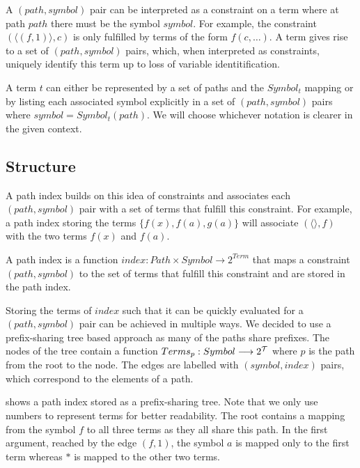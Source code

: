 A $(path, symbol)$ pair can be interpreted as a constraint on a term where at path $path$ there must be the symbol $symbol$. For example, the constraint $(\langle (f,1) \rangle, c)$ is only fulfilled by terms of the form $f(c,\dots)$. A term gives rise to a set of $(path, symbol)$ pairs, which, when interpreted as constraints, uniquely identify this term up to loss of variable identitification.

A term $t$ can either be represented by a set of paths and the $Symbol_{t}$ mapping or by listing each associated symbol explicitly in a set of $(path, symbol)$ pairs where $symbol = Symbol_{t}(path)$. We will choose whichever notation is clearer in the given context.

\subsection{Structure}
A path index builds on this idea of constraints and associates each $(path, symbol)$ pair with a set of terms that fulfill this constraint. For example, a path index storing the terms $\{f(x), f(a), g(a)\}$ will associate $(\langle \rangle, f)$ with the two terms $f(x)$ and $f(a)$.

\begin{defn}
  A path index is a function $index: Path \times Symbol \longrightarrow 2^{Term}$ that maps a constraint $(path,symbol)$ to the set of terms that fulfill this constraint and are stored in the path index.
\end{defn}

Storing the terms of $index$ such that it can be quickly evaluated for a $(path, symbol)$ pair can be achieved in multiple ways. We decided to use a prefix-sharing tree based approach as many of the paths share prefixes. The nodes of the tree contain a function $Terms_{p}: Symbol  \longrightarrow 2^{\mathcal{T}}$ where $p$ is the path from the root to the node. The edges are labelled with $(symbol, index)$ pairs, which correspond to the elements of a path.

 shows a path index stored as a prefix-sharing tree. Note that we only use numbers to represent terms for better readability. The root contains a mapping from the symbol $f$ to all three terms as they all share this path. In the first argument, reached by the edge $(f,1)$, the symbol $a$ is mapped only to the first term whereas $*$ is mapped to the other two terms.

